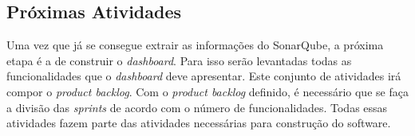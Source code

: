 \subsection{Próximas Atividades}
\label{futuro}
Uma vez que já se consegue extrair as informações do SonarQube, a próxima etapa é a de construir o \textit{dashboard}. Para isso serão levantadas todas as funcionalidades que o \textit{dashboard} deve apresentar. Este conjunto de atividades irá compor o \textit{product backlog}. Com o \textit{product backlog} definido, é necessário que se faça a divisão das \textit{sprints} de acordo com o número de funcionalidades. Todas essas atividades fazem parte das atividades necessárias para construção do software.
